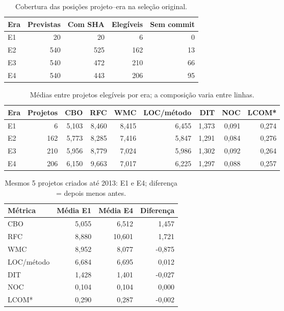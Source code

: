 \begin{table}[H]
\centering\small
\caption{Cobertura das posições projeto--era na seleção original.}
\begin{tabular}{lrrrr}
\hline
Era & Previstas & Com SHA & Elegíveis & Sem commit \\ \hline
E1 & 20 & 20 & 6 & 0 \\
E2 & 540 & 525 & 162 & 13 \\
E3 & 540 & 472 & 210 & 66 \\
E4 & 540 & 443 & 206 & 95 \\
\hline
\end{tabular}
\end{table}
\begin{table}[H]
\centering\small
\caption{Médias entre projetos elegíveis por era; a composição varia entre linhas.}
\begin{tabular}{lrrrrrrrr}
\hline
Era & Projetos & CBO & RFC & WMC & LOC/método & DIT & NOC & LCOM* \\ \hline
E1 & 6 & 5,103 & 8,460 & 8,415 & 6,455 & 1,373 & 0,091 & 0,274 \\
E2 & 162 & 5,773 & 8,285 & 7,416 & 5,847 & 1,291 & 0,084 & 0,276 \\
E3 & 210 & 5,956 & 8,779 & 7,024 & 5,986 & 1,302 & 0,092 & 0,264 \\
E4 & 206 & 6,150 & 9,663 & 7,017 & 6,225 & 1,297 & 0,088 & 0,257 \\
\hline
\end{tabular}
\end{table}
\begin{table}[H]
\centering\small
\caption{Mesmos 5 projetos criados até 2013: E1 e E4; diferença = depois menos antes.}
\begin{tabular}{lrrr}
\hline
Métrica & Média E1 & Média E4 & Diferença \\ \hline
CBO & 5,055 & 6,512 & 1,457 \\
RFC & 8,880 & 10,601 & 1,721 \\
WMC & 8,952 & 8,077 & -0,875 \\
LOC/método & 6,684 & 6,695 & 0,012 \\
DIT & 1,428 & 1,401 & -0,027 \\
NOC & 0,104 & 0,104 & 0,000 \\
LCOM* & 0,290 & 0,287 & -0,002 \\
\hline
\end{tabular}
\end{table}
